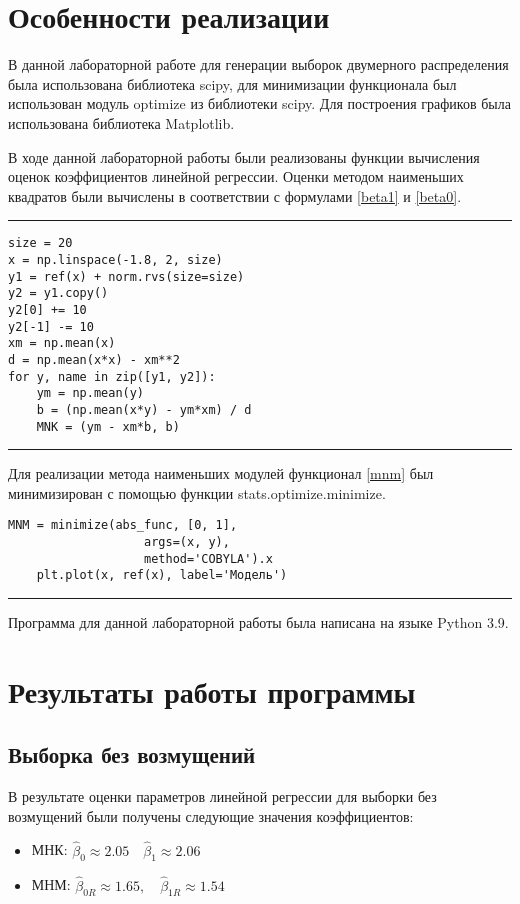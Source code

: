 \documentclass[12pt]{article}
\begin{document}
\newpage
	\section{Особенности реализации}
	
В данной лабораторной работе для генерации выборок двумерного распределения была использована библиотека scipy, для минимизации функционала был использован модуль optimize из библиотеки scipy. Для построения графиков была использована библиотека Matplotlib. 

В ходе данной лабораторной работы были реализованы функции вычисления оценок коэффициентов линейной регрессии. 
Оценки методом наименьших квадратов были вычислены в соответствии с формулами \eqref{beta1} и \eqref{beta0}. 
\vskip 0.3cm
\hrule width 16cm height 1pt
\begin{verbatim}
size = 20
x = np.linspace(-1.8, 2, size)
y1 = ref(x) + norm.rvs(size=size)
y2 = y1.copy()
y2[0] += 10
y2[-1] -= 10
xm = np.mean(x)
d = np.mean(x*x) - xm**2
for y, name in zip([y1, y2]):
    ym = np.mean(y)
    b = (np.mean(x*y) - ym*xm) / d
    MNK = (ym - xm*b, b)
\end{verbatim}
\vskip 0.3cm
\hrule width 16cm height 1pt
\vskip 0.3cm
Для реализации метода наименьших модулей функционал \eqref{mnm} был минимизирован с помощью функции stats.optimize.minimize.
\begin{verbatim}
MNM = minimize(abs_func, [0, 1], 
                   args=(x, y),
                   method='COBYLA').x
    plt.plot(x, ref(x), label='Модель')
\end{verbatim}
\vskip 0.3cm
\hrule width 16cm height 1pt
\vskip 0.3cm
Программа для данной лабораторной работы была написана на языке Python 3.9. 

	

	\newpage
	
	\section{Результаты работы программы}

\subsection{Выборка без возмущений}

	В результате оценки параметров линейной регрессии для выборки без возмущений были получены следующие значения коэффициентов:

	\begin{itemize}
		\item МНК: $\hat{\beta}_0 \approx 2.05 \quad \hat{\beta}_1 \approx 2.06$
		\item МНМ: $\hat{\beta}_{0R} \approx 1.65, \quad \hat{\beta}_{1R} \approx 1.54$
	\end{itemize}
\end{document}
